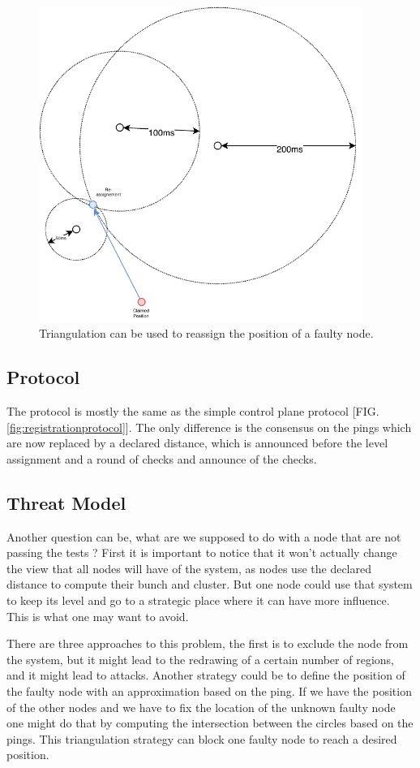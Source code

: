 \documentclass[a4paper,11pt,oneside]{report}
\begin{document}
\begin{figure}[!h] 
\centering
\includegraphics[width=300pt]{figures/triangulation_strategy}
\caption{Triangulation can be used to reassign the position of a faulty node.  }
\label{fig:triangulation_strategy}
\end{figure}

\subsection{Protocol}
The protocol is mostly the same as the simple control plane protocol [FIG.
\autoref{fig:registrationprotocol}]. The only difference is the consensus on the
pings which are now replaced by a declared distance, which is announced before
the level assignment and a round of checks and announce of the checks. 

\subsection{Threat Model}
Another question can be, what are we supposed to do with a node that are not
passing the tests ? First it is important to notice that it won't actually
change the view that all nodes will have of the system, as nodes use the
declared distance to compute their bunch and cluster. But one node could use
that system to keep its level and go to a strategic place where it can have
more influence. This is what one may want to avoid. 

There are three approaches to this problem, the first is to exclude the node
from the system, but it might lead to the redrawing of a certain number of
regions, and it might lead to attacks. Another strategy could be to define the
position of the faulty node with an approximation based on the ping. If we have
the position of the other nodes and we have to fix the location of the unknown
faulty node one might do that by computing the intersection between the circles
based on the pings. This triangulation strategy can block one faulty node to
reach a desired position. 
\end{document}
